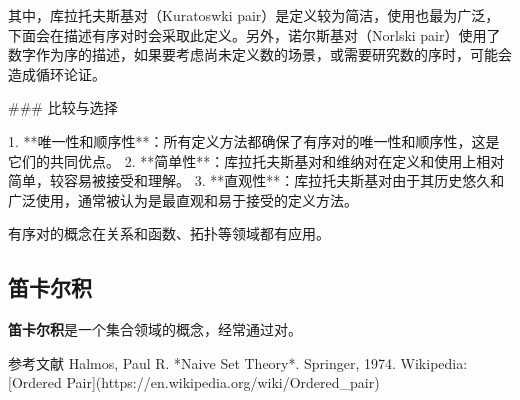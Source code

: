 其中，库拉托夫斯基对（Kuratoswki pair）是定义较为简洁，使用也最为广泛，下面会在描述有序对时会采取此定义。另外，诺尔斯基对（Norlski pair）使用了数字作为序的描述，如果要考虑尚未定义数的场景，或需要研究数的序时，可能会造成循环论证。

### 比较与选择

1. **唯一性和顺序性**：所有定义方法都确保了有序对的唯一性和顺序性，这是它们的共同优点。
2. **简单性**：库拉托夫斯基对和维纳对在定义和使用上相对简单，较容易被接受和理解。
3. **直观性**：库拉托夫斯基对由于其历史悠久和广泛使用，通常被认为是最直观和易于接受的定义方法。

有序对的概念在关系和函数、拓扑等领域都有应用。


\subsection{笛卡尔积}

\textbf{笛卡尔积}是一个集合领域的概念，经常通过对。

参考文献
Halmos, Paul R. *Naive Set Theory*. Springer, 1974.
Wikipedia: [Ordered Pair](https://en.wikipedia.org/wiki/Ordered_pair)